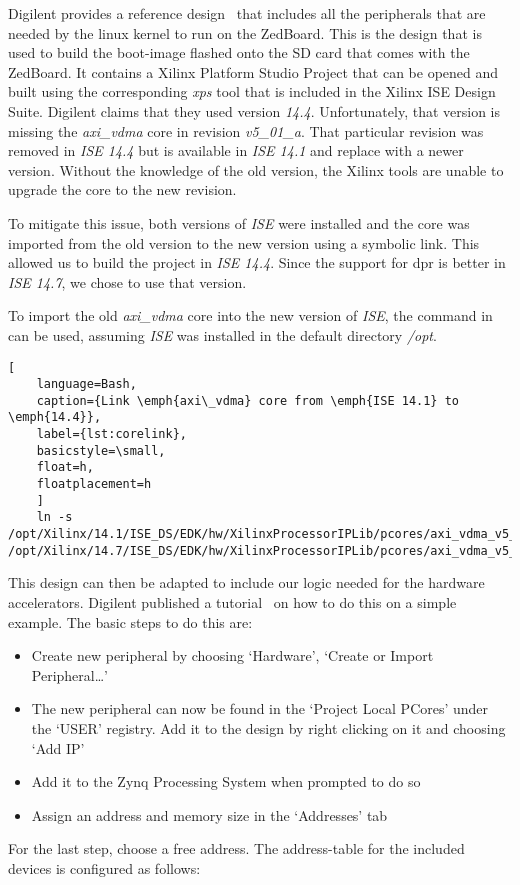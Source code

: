 Digilent provides a reference design~\cite{DigilentReferenceDesign} that
includes all the peripherals that are needed by the linux kernel to run on the
ZedBoard.
This is the design that is used to build the boot-image flashed onto the SD
card that comes with the ZedBoard.
It contains a Xilinx Platform Studio Project that can be opened and built using
the corresponding \emph{xps} tool that is included in the Xilinx ISE Design
Suite.
Digilent claims that they used version \emph{14.4}. Unfortunately, that version
is missing the \emph{axi\_vdma} core in revision \emph{v5\_01\_a}.
That particular revision was removed in \emph{ISE 14.4} but is available in
\emph{ISE 14.1} and replace with a newer version.
Without the knowledge of the old version, the Xilinx tools are unable to upgrade
the core to the new revision.

To mitigate this issue, both versions of \emph{ISE} were installed and the core
was imported from the old version to the new version using a symbolic link.
This allowed us to build the project in \emph{ISE 14.4}.
Since the support for \gls{dpr} is better in \emph{ISE 14.7}, we chose to use
that version.

To import the old \emph{axi\_vdma} core into the new version of \emph{ISE}, the
command in  can be used, assuming \emph{ISE} was installed in
the default directory \emph{/opt}.
\begin{lstlisting}[
	language=Bash,
	caption={Link \emph{axi\_vdma} core from \emph{ISE 14.1} to \emph{14.4}},
	label={lst:corelink},
	basicstyle=\small,
	float=h,
	floatplacement=h
	]
	ln -s /opt/Xilinx/14.1/ISE_DS/EDK/hw/XilinxProcessorIPLib/pcores/axi_vdma_v5_01_a /opt/Xilinx/14.7/ISE_DS/EDK/hw/XilinxProcessorIPLib/pcores/axi_vdma_v5_01_a
\end{lstlisting}

This design can then be adapted to include our logic needed for the hardware
accelerators.
Digilent published a tutorial~\cite{DigilentTutorial} on how to do this on a
simple example.
The basic steps to do this are:
\begin{itemize}
	\item Create new peripheral by choosing `Hardware', `Create or Import
		Peripheral\ldots'
	\item The new peripheral can now be found in the `Project Local PCores'
		under the `USER' registry.
		Add it to the design by right clicking on it and choosing `Add IP'
	\item Add it to the Zynq Processing System when prompted to do so
	\item Assign an address and memory size in the `Addresses' tab
\end{itemize}
For the last step, choose a free address.
The address-table for the included devices is configured as follows:

